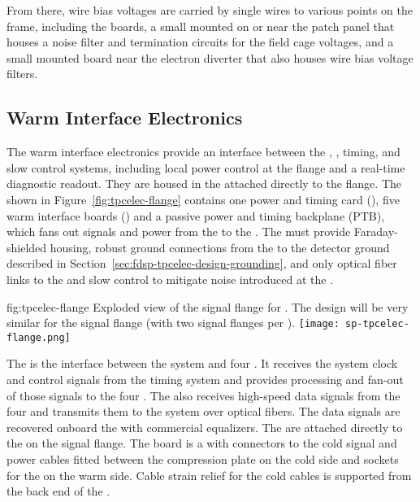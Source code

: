 From there, wire bias voltages are carried by single wires to 
various points on the  frame, including the  
boards, a small  mounted on or near the patch panel that 
houses a noise filter and termination circuits for the field cage 
voltages, and a small mounted board near the electron diverter 
that also houses wire bias voltage filters.

\subsection{Warm Interface Electronics}
\label{sec:fdsp-tpcelec-design-warm}

The warm interface electronics provide an interface between the 
, , timing, and slow control systems, including 
local power control at the flange and a real-time diagnostic readout. 
They are housed in the  attached directly to the  
flange.  The  shown in Figure~\ref{fig:tpcelec-flange} 
contains one power and timing card (), five warm interface 
boards () and a passive power and timing backplane (PTB), 
which fans out signals and  power from the  to the 
. The  must provide Faraday-shielded housing, 
robust ground connections from the  to the detector ground 
described in Section~\ref{sec:fdsp-tpcelec-design-grounding}, and only 
optical fiber links to the  and slow control to mitigate 
noise introduced at the  \fdth.

\begin{dunefigure}
{fig:tpcelec-flange}
{Exploded view of the  signal flange for .  
The design will be very similar for the   
signal flange (with two  signal flanges per \fdth).}
\texttt{[image: sp-tpcelec-flange.png]}
\end{dunefigure}

The  is the interface between the  system and four
. It receives the system clock and control signals from the
timing system and provides processing and fan-out of those signals to the four
. The  also receives high-speed data signals from the four 
 and transmits them to the  system over optical
fibers. The data signals are recovered onboard the  with commercial 
equalizers. The  are attached directly to the 
 \fdth on the signal flange. The \fdth board is a  
with connectors to the cold signal and  power cables fitted
between the compression plate on the cold side and sockets for
the  on the warm side. Cable strain relief for the cold cables is 
supported from the back end of the \fdth.

